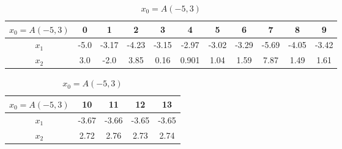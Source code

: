\begin{table}[H]
\centering
\setlength{\abovecaptionskip}{0cm} 
\setlength{\belowcaptionskip}{-0.5cm}
\scriptsize
\begin{tabular}{|c|c|c|c|c|c|c|c|c|c|c|}
\hline
$x_0=A(-5,3)$&0&1&2&3&4&5&6&7&8&9\\
\hline
$x_1$&-5.0 & -3.17 & -4.23 & -3.15 & -2.97 & -3.02 & -3.29 & -5.69 & -4.05& -3.42\\
\hline
$x_2$&3.0 & -2.0 & 3.85 & 0.16 & 0.901 & 1.04 & 1.59 & 7.87 & 1.49 & 1.61
\\
\hline
\end{tabular}
\begin{tabular}{|c|c|c|c|c|}
\hline
$x_0=A(-5,3)$&10&11&12&13\\
\hline
$x_1$ & -3.67 & -3.66 & -3.65 & -3.65\\
\hline
$x_2$ & 2.72 & 2.76 & 2.73 & 2.74
\\
\hline

\end{tabular}
\caption{$x_0=A(-5,3)$}
\end{table}

